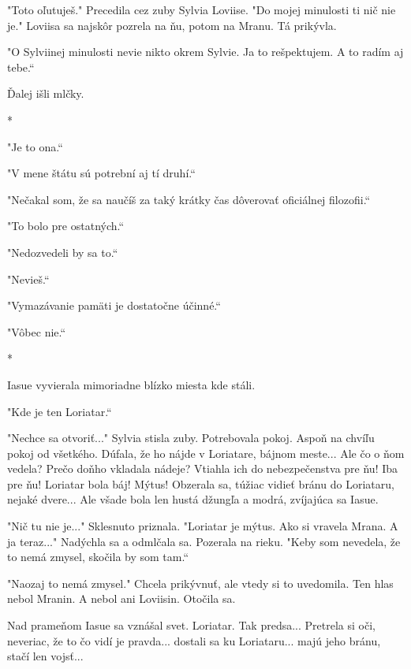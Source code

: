\documentclass{book}
\begin{document}
"$ $Toto oľutuješ."$ $ Precedila cez zuby Sylvia Loviise. "$ $Do mojej minulosti ti nič nie je."$ $ Loviisa sa najskôr pozrela na ňu, potom na Mranu. Tá prikývla.

"$ $O Sylviinej minulosti nevie nikto okrem Sylvie. Ja to rešpektujem. A to radím aj tebe.“

Ďalej išli mlčky.

\begin{center}

*

\end{center}

"$ $Je to ona.“

"$ $V mene štátu sú potrební aj tí druhí.“

"$ $Nečakal som, že sa naučíš za taký krátky čas dôverovať oficiálnej filozofii.“

"$ $To bolo pre ostatných.“

"$ $Nedozvedeli by sa to.“

"$ $Nevieš.“

"$ $Vymazávanie pamäti je dostatočne účinné.“

"$ $Vôbec nie.“

\begin{center}

*

\end{center}

Iasue vyvierala mimoriadne blízko miesta kde stáli.

"$ $Kde je ten Loriatar.“

"$ $Nechce sa otvoriť..."$ $ Sylvia stisla zuby. Potrebovala pokoj. Aspoň na chvíľu pokoj od všetkého. Dúfala, že ho nájde v Loriatare, bájnom meste... Ale čo o ňom vedela? Prečo doňho vkladala nádeje? Vtiahla ich do nebezpečenstva pre ňu! Iba pre ňu! Loriatar bola báj! Mýtus! Obzerala sa, túžiac vidieť bránu do Loriataru, nejaké dvere... Ale všade bola len hustá džungľa a modrá, zvíjajúca sa Iasue.

"$ $Nič tu nie je..."$ $ Sklesnuto priznala. "$ $Loriatar je mýtus. Ako si vravela Mrana. A ja teraz..."$ $ Nadýchla sa a odmlčala sa. Pozerala na rieku. "$ $Keby som nevedela, že to nemá zmysel, skočila by som tam.“

"$ $Naozaj to nemá zmysel."$ $ Chcela prikývnuť, ale vtedy si to uvedomila. Ten hlas nebol Mranin. A nebol ani Loviisin. Otočila sa.

Nad prameňom Iasue sa vznášal svet. Loriatar. Tak predsa... Pretrela si oči, neveriac, že to čo vidí je pravda... dostali sa ku Loriataru... majú jeho bránu, stačí len vojsť...
\end{document}
